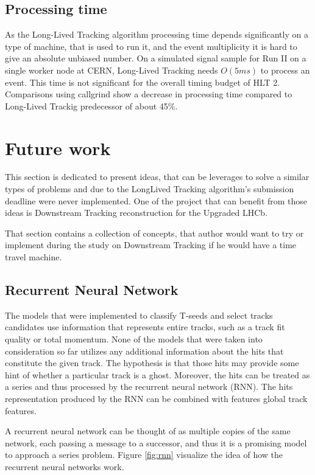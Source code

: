 \subsection{Processing time}

As the Long-Lived Tracking algorithm processing time depends significantly on a type of machine, that is used to run it, and the event multiplicity it is hard to give an absolute unbiased number. On a simulated signal sample for Run II on a single worker node at CERN, Long-Lived Tracking needs $O(5 ms)$ to process an event. This time is not significant for the overall timing budget of HLT 2.
Comparisons using callgrind show a decrease in processing time compared to Long-Lived Trackig predecessor of about 45\%.

\section{Future work}
This section is dedicated to present ideas, that can be leverages to solve a similar types of problems and due to the LongLived Tracking algorithm's submission deadline were never implemented. One of the project that can benefit from those ideas is Downstream Tracking reconstruction for the Upgraded LHCb. 

That section contains a collection of concepts, that author would want to try or implement during the study on Downstream Tracking if he would have a time travel machine.

\subsection{Recurrent Neural Network}
The models that were implemented to classify T-seeds and select tracks candidates use information that represents entire tracks, such as a track fit quality or total momentum. None of the models that were taken into consideration so far utilizes any additional information about the hits that constitute the given track.  The hypothesis is that those hits may provide some hint of whether a particular track is a ghost. 
Moreover, the hits can be treated as a series and thus processed by the recurrent neural network (RNN). The hits representation produced by the RNN can be combined with features global track features. 

A recurrent neural network can be thought of as multiple copies of the same network, each passing a message to a successor, and thus it is a promising model to approach a series problem.  Figure \ref{fig:rnn} visualize the idea of how the recurrent neural networks work. 

